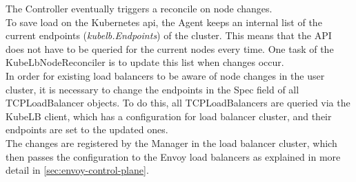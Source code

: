 The Controller eventually triggers a reconcile on node changes.
\\
To save load on the Kubernetes api, the Agent keeps an internal list of the current endpoints (\textit{kubelb.Endpoints}) of the cluster.
This means that the API does not have to be queried for the current nodes every time.
One task of the KubeLbNodeReconciler is to update this list when changes occur.
\\
In order for existing load balancers to be aware of node changes in the user cluster, it is necessary to change the endpoints in the Spec field of all TCPLoadBalancer objects.
To do this, all TCPLoadBalancers are queried via the KubeLB client, which has a configuration for load balancer cluster, and their endpoints are set to the updated ones.
\\
The changes are registered by the Manager in the load balancer cluster, which then passes the configuration to the Envoy load balancers as explained in more detail in \autoref{sec:envoy-control-plane}.
\\
